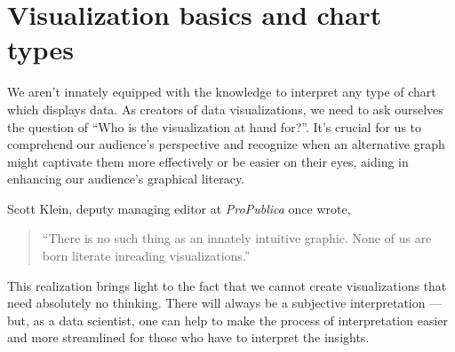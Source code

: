 \chapter{Visualization basics and chart types}
We aren't innately equipped with the knowledge to interpret any type of chart which displays data. As creators of data visualizations, we need to ask ourselves the question of ``Who is the visualization at hand for?''. It's crucial for us to comprehend our audience's perspective and recognize when an alternative graph might captivate them more effectively or be easier on their eyes, aiding in enhancing our audience's graphical literacy.

Scott Klein, deputy managing editor at \textit{ProPublica} once wrote,
\begin{quote}
``There is no such thing as an innately intuitive graphic. None of us are born literate inreading visualizations.''
\end{quote}
This realization brings light to the fact that we cannot create visualizations that need absolutely no thinking. There will always be a subjective interpretation --- but, as a data scientist, one can help to make the process of interpretation easier and more streamlined for those who have to interpret the insights.

